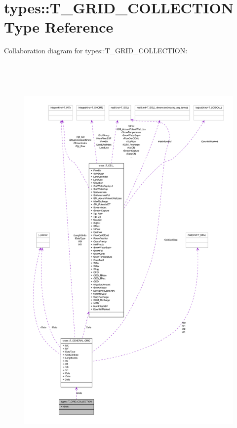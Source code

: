 \hypertarget{typetypes_1_1_t___g_r_i_d___c_o_l_l_e_c_t_i_o_n}{
\section{types::T\_\-GRID\_\-COLLECTION Type Reference}
\label{typetypes_1_1_t___g_r_i_d___c_o_l_l_e_c_t_i_o_n}
}


Collaboration diagram for types::T\_\-GRID\_\-COLLECTION:\nopagebreak
\begin{figure}[H]
\begin{center}
\leavevmode
\includegraphics[height=600pt]{typetypes_1_1_t___g_r_i_d___c_o_l_l_e_c_t_i_o_n__coll__graph}
\end{center}
\end{figure}
